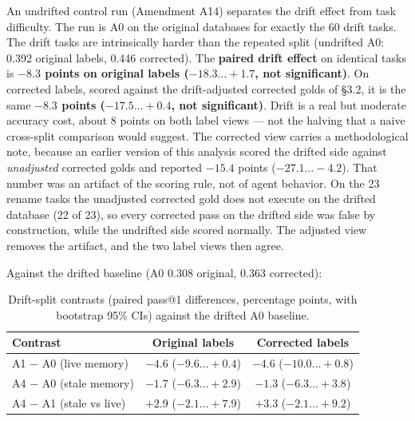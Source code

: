 \documentclass[sigconf, nonacm]{acmart}
\begin{document}
An undrifted control run (Amendment A14) separates the drift effect from task difficulty. The run is A0 on the original databases for exactly the 60 drift tasks. The drift tasks are intrinsically harder than the repeated split (undrifted A0: 0.392 original labels, 0.446 corrected). The \textbf{paired drift effect} on identical tasks is \textbf{$-8.3$ points on original labels ($-18.3\ldots+1.7$, not significant)}. On corrected labels, scored against the drift-adjusted corrected golds of \S3.2, it is the same \textbf{$-8.3$ points ($-17.5\ldots+0.4$, not significant)}. Drift is a real but moderate accuracy cost, about 8 points on both label views --- not the halving that a naive cross-split comparison would suggest. The corrected view carries a methodological note, because an earlier version of this analysis scored the drifted side against \emph{unadjusted} corrected golds and reported $-15.4$ points ($-27.1\ldots-4.2$). That number was an artifact of the scoring rule, not of agent behavior. On the 23 rename tasks the unadjusted corrected gold does not execute on the drifted database (22 of 23), so every corrected pass on the drifted side was false by construction, while the undrifted side scored normally. The adjusted view removes the artifact, and the two label views then agree.

Against the drifted baseline (A0 0.308 original, 0.363 corrected):

\begin{table}[t]
  \caption{Drift-split contrasts (paired pass@1 differences, percentage points, with bootstrap 95\% CIs) against the drifted A0 baseline.}
  \label{tab:drift}
  \centering
  \begin{tabular}{lcc}
    \toprule
    Contrast & Original labels & Corrected labels\\
    \midrule
    A1 $-$ A0 (live memory) & $-4.6$ ($-9.6\ldots+0.4$) & $-4.6$ ($-10.0\ldots+0.8$)\\
    A4 $-$ A0 (stale memory) & $-1.7$ ($-6.3\ldots+2.9$) & $-1.3$ ($-6.3\ldots+3.8$)\\
    A4 $-$ A1 (stale vs live) & $+2.9$ ($-2.1\ldots+7.9$) & $+3.3$ ($-2.1\ldots+9.2$)\\
    \bottomrule
  \end{tabular}
\end{table}
\end{document}
